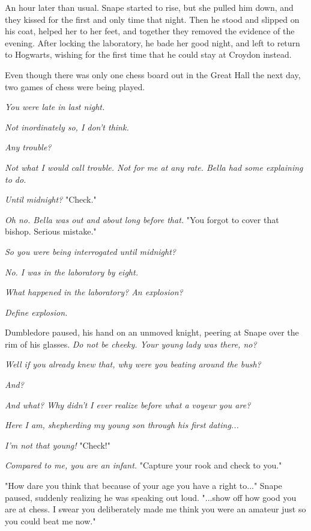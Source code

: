 \documentclass[a4paper,11pt]{article}
\begin{document}
An hour later than usual. Snape started to rise, but she pulled him down, and they kissed for the first and only time that night. Then he stood and slipped on his coat, helped her to her feet, and together they removed the evidence of the evening. After locking the laboratory, he bade her good night, and left to return to Hogwarts, wishing for the first time that he could stay at Croydon instead.

Even though there was only one chess board out in the Great Hall the next day, two games of chess were being played.

\emph{You were late in last night.}

\emph{Not inordinately so, I don't think.}

\emph{Any trouble?}

\emph{Not what I would call trouble. Not for me at any rate. Bella had some explaining to do.}

\emph{Until midnight?} "Check."

\emph{Oh no. Bella was out and about long before that.} "You forgot to cover that bishop. Serious mistake."

\emph{So you were being interrogated until midnight?}

\emph{No. I was in the laboratory by eight.}

\emph{What happened in the laboratory? An explosion?}

\emph{Define explosion.}

Dumbledore paused, his hand on an unmoved knight, peering at Snape over the rim of his glasses. \emph{Do not be cheeky. Your young lady was there, no?}

\emph{Well if you already knew that, why were you beating around the bush?}

\emph{And?}

\emph{And what? Why didn't I ever realize before what a voyeur you are?}

\emph{Here I am, shepherding my young son through his first dating...}

\emph{I'm not that young!} "Check!"

\emph{Compared to me, you are an infant.} "Capture your rook and check to you."

"How dare you think that because of your age you have a right to..." Snape paused, suddenly realizing he was speaking out loud. "...show off how good you are at chess. I swear you deliberately made me think you were an amateur just so you could beat me now."
\end{document}
